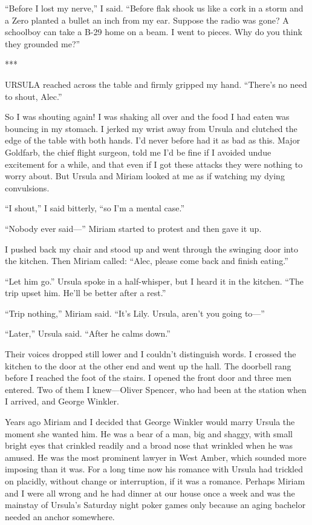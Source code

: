 \documentclass{novel}
\begin{document}
{“Before I lost my nerve,” I said. “Before flak shook us like a cork in a storm and a Zero planted a bullet an inch from my ear. Suppose the radio was gone? A schoolboy can take a B-29 home on a beam. I went to pieces. Why do you think they grounded me?”

***

URSULA reached across the table and firmly gripped my hand. “There’s no need to shout, Alec.”

So I was shouting again! I was shaking all over and the food I had eaten was bouncing in my stomach. I jerked my wrist away from Ursula and clutched the edge of the table with both hands. I’d never before had it as bad as this. Major Goldfarb, the chief flight surgeon, told me I’d be fine if I avoided undue excitement for a while, and that even if I got these attacks they were nothing to worry about. But Ursula and Miriam looked at me as if watching my dying convulsions.

“I shout,” I said bitterly, “so I’m a mental case.”

“Nobody ever said—” Miriam started to protest and then gave it up.

I pushed back my chair and stood up and went through the swinging door into the kitchen. Then Miriam called: “Alec, please come back and finish eating.”

“Let him go.” Ursula spoke in a half-whisper, but I heard it in the kitchen. “The trip upset him. He’ll be better after a rest.”

“Trip nothing,” Miriam said. “It’s Lily. Ursula, aren’t you going to—”

“Later,” Ursula said. “After he calms down.”

Their voices dropped still lower and I couldn’t distinguish words. I crossed the kitchen to the door at the other end and went up the hall. The doorbell rang before I reached the foot of the stairs. I opened the front door and three men entered. Two of them I knew—Oliver Spencer, who had been at the station when I arrived, and George Winkler.

Years ago Miriam and I decided that George Winkler would marry Ursula the moment she wanted him. He was a bear of a man, big and shaggy, with small bright eyes that crinkled readily and a broad nose that wrinkled when he was amused. He was the most prominent lawyer in West Amber, which sounded more imposing than it was. For a long time now his romance with Ursula had trickled on placidly, without change or interruption, if it was a romance. Perhaps Miriam and I were all wrong and he had dinner at our house once a week and was the mainstay of Ursula’s Saturday night poker games only because an aging bachelor needed an anchor somewhere.

}
\end{document}

